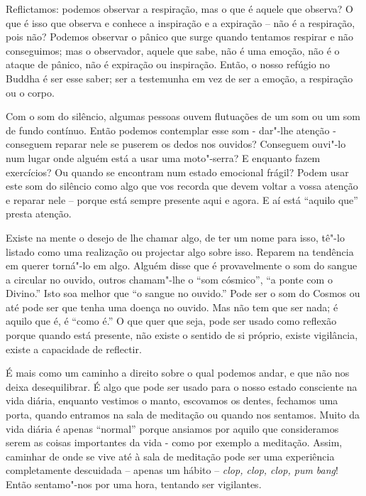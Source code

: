 Reflictamos: podemos observar a respiração, mas o que é aquele que
observa? O que é isso que observa e conhece a inspiração e a expiração
-- não é a respiração, pois não? Podemos observar o pânico que surge
quando tentamos respirar e não conseguimos; mas o observador, aquele que
sabe, não é uma emoção, não é o ataque de pânico, não é expiração ou
inspiração. Então, o nosso refúgio no Buddha é ser esse saber; ser a
testemunha em vez de ser a emoção, a respiração ou o corpo.

Com o som do silêncio, algumas pessoas ouvem flutuações de um som ou um
som de fundo contínuo. Então podemos contemplar esse som - dar"-lhe
atenção - conseguem reparar nele se puserem os dedos nos ouvidos?
Conseguem ouvi"-lo num lugar onde alguém está a usar uma moto"-serra? E
enquanto fazem exercícios? Ou quando se encontram num estado emocional
frágil? Podem usar este som do silêncio como algo que vos recorda que
devem voltar a vossa atenção e reparar nele -- porque está sempre
presente aqui e agora. E aí está ``aquilo que'' presta atenção.

Existe na mente o desejo de lhe chamar algo, de ter um nome para isso,
tê"-lo listado como uma realização ou projectar algo sobre isso. Reparem
na tendência em querer torná"-lo em algo. Alguém disse que é
provavelmente o som do sangue a circular no ouvido, outros chamam"-lhe o
``som cósmico'', ``a ponte com o Divino.'' Isto soa melhor que ``o
sangue no ouvido.'' Pode ser o som do Cosmos ou até pode ser que tenha
uma doença no ouvido. Mas não tem que ser nada; é aquilo que é, é ``como
é.'' O que quer que seja, pode ser usado como reflexão porque quando
está presente, não existe o sentido de si próprio, existe vigilância,
existe a capacidade de reflectir.  

É mais como um caminho a direito sobre o qual podemos andar, e que não
nos deixa desequilibrar.  É algo que pode ser usado para o nosso estado
consciente na vida diária, enquanto vestimos o manto, escovamos os
dentes, fechamos uma porta, quando entramos na sala de meditação ou
quando nos sentamos. Muito da vida diária é apenas ``normal'' porque
ansiamos por aquilo que consideramos serem as coisas importantes da vida
- como por exemplo a meditação. Assim, caminhar de onde se vive até à
sala de meditação pode ser uma experiência completamente descuidada --
apenas um hábito -- \emph{clop, clop, clop, pum bang}! Então sentamo"-nos
por uma hora, tentando ser vigilantes.

